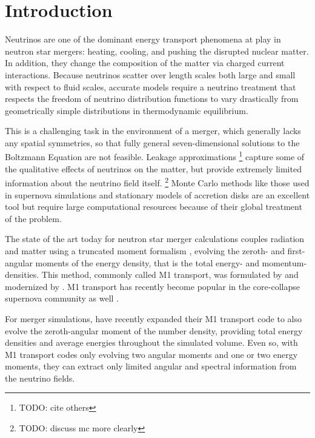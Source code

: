 \documentclass[aps,floatfix,prd,superscriptaddress,twocolumn]{revtex4-1}
\begin{document}
\maketitle

\section{Introduction}
Neutrinos are one of the dominant energy transport phenomena at play in
neutron star mergers: heating, cooling, and pushing the disrupted nuclear
matter.
In addition, they change the composition of the matter via charged current
interactions.
Because neutrinos scatter over length scales both large and small with
respect to fluid scales, accurate models require a neutrino treatment that
respects the freedom of neutrino distribution functions to vary
drastically from geometrically simple distributions in thermodynamic equilibrium.

This is a challenging task in the environment of a merger,
which generally lacks any spatial symmetries, so that fully general
seven-dimensional solutions to the Boltzmann Equation are not feasible.
Leakage approximations
\citep{ruff1996-leakage_part1,ross2003-leakage_part2,
  deat2013-leakage, pere2016-asl, radi2016-dynamical}
\footnote{TODO: cite others}
capture some of the qualitative effects of neutrinos on the matter, but
provide extremely limited information about the neutrino field itself.
\footnote{TODO: discuss mc more clearly}
Monte Carlo methods like those
used in supernova simulations \cite{abdi2012-monte_carlo}
and stationary models of accretion disks \cite{rich2015-monte_carlo}
are an excellent tool but require large computational resources
because of their global treatment of the problem.

The state of the art today for neutron star merger calculations
couples radiation and matter using a truncated moment formalism
\citep{fouc2015-m1_nsbh, fouc2016-m1_nsns},
evolving the zeroth- and first-angular moments of the energy density,
that is the total energy- and momentum-densities.
This method, commonly called M1 transport, was formulated by
\cite{thor1981-truncated_moment} and modernized by
\cite{shib2011-truncated_moment}.
M1 transport has recently become popular in the core-collapse supernova
community as well
\cite{kuro2012-m1_ccsne,just2015-m1_code,ocon2015-gr1d_with_nu,
  skin2016-ray_vs_m1,robe2016-gr_m1_ccsne}.

For merger simulations, \cite{fouc2016-m1_evolve_n} have recently
expanded their M1 transport code
to also evolve the zeroth-angular moment of the number density,
providing total energy densities and average energies throughout the
simulated volume.
Even so, with M1 transport codes only evolving two angular moments
and one or two energy moments,
they can extract only limited angular and spectral information
from the neutrino fields.
\end{document}
